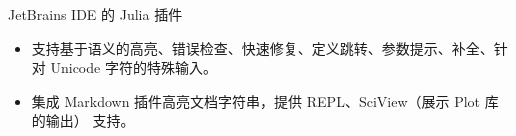 \documentclass{resume}
\begin{document}

JetBrains IDE 的 Julia 插件
\begin{itemize}
  \item 支持基于语义的高亮、错误检查、快速修复、定义跳转、参数提示、补全、针对 Unicode 字符的特殊输入。
  \item 集成 Markdown 插件高亮文档字符串，提供 REPL、SciView（展示 Plot 库的输出） 支持。
\end{itemize}


\end{document}
